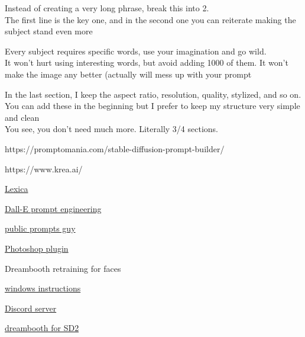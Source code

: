                 Instead of creating a very long phrase, break this into
                2.\\
                The first line is the key one, and in the second one you
                can reiterate making the subject stand even more
               
                Every subject requires specific words, use your
                imagination and go wild.\\
                It won't hurt using interesting words, but avoid adding
                1000 of them. It won't make the image any better
                (actually will mess up with your prompt
               
                In the last section, I keep the aspect ratio,
                resolution, quality, stylized, and so on. You can add
                these in the beginning but I prefer to keep my structure
                very simple and clean\\
                You see, you don't need much more. Literally 3/4
                sections.
               
             
              https://promptomania.com/stable-diffusion-prompt-builder/
             
              https://www.krea.ai/
             
              \href{https://lexica.art/}{Lexica}
             
              \href{https://docs.google.com/document/d/11WlzjBT0xRpQhP9tFMtxzd0q6ANIdHPUBkMV-YB043U/edit\#}{Dall-E
              prompt engineering}
             
              \href{https://publicprompts.art/}{public prompts guy}
             
           
            \href{https://christiancantrell.com/\#ai-ml}{Photoshop
            plugin}
           
            Dreambooth retraining for faces

             
            \tightlist
             
              \href{https://pastebin.com/xcFpp9Mr}{windows instructions}
             
              \href{https://discord.com/channels/1023277529424986162/}{Discord
              server}
             
              \href{https://github.com/nitrosocke/dreambooth-training-guide/blob/main/README.md\#how-to-fine-tune-stable-diffusion-20}{dreambooth
              for SD2}
             
